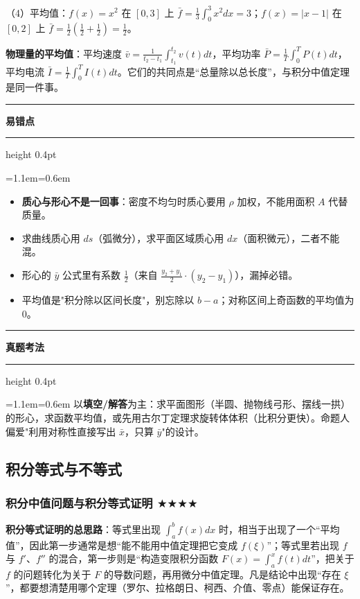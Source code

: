 \documentclass[11pt,openany,UTF8]{ctexbook}
\newcommand{\callouthead}[2]{%
  \par\addvspace{7pt}\noindent
  {\color{#1}\rule[-0.15em]{3pt}{1.05em}}\hspace{0.5em}%
  {\bfseries\color{#1}#2}\par\nobreak\vspace{-0.35em}%
  {\color{rulesep}\hrule height 0.4pt}\nobreak\vspace{0.45em}%
  \begingroup\small\setlength{\parindent}{0pt}%
  \leftskip=1.1em\rightskip=0.6em\noindent\ignorespaces}
\newcommand{\calloutend}{\par\endgroup\addvspace{7pt}}
\newenvironment{callwarn}[1]{\callouthead{warnbar}{#1}}{\calloutend}
\newenvironment{callexam}[1]{\callouthead{exambar}{#1}}{\calloutend}
\begin{document}
（4）平均值：$f(x)=x^2$ 在 $[0,3]$ 上 $\bar{f}=\frac{1}{3}\int_0^3x^2dx=3$；$f(x)=\lvert x-1\rvert$ 在 $[0,2]$ 上 $\bar{f}=\frac{1}{2}\left(\frac{1}{2}+\frac{1}{2}\right)=\frac{1}{2}$。

\textbf{物理量的平均值}：平均速度 $\bar{v}=\frac{1}{t_2-t_1}\int_{t_1}^{t_2}v(t)dt$，平均功率 $\bar{P}=\frac{1}{T}\int_0^TP(t)dt$，平均电流 $\bar{I}=\frac{1}{T}\int_0^TI(t)dt$。它们的共同点是“总量除以总长度”，与积分中值定理是同一件事。

\begin{callwarn}{易错点}
\begin{itemize}
\item \textbf{质心与形心不是一回事}：密度不均匀时质心要用 $\rho$ 加权，不能用面积 $A$ 代替质量。
\item 求曲线质心用 $ds$（弧微分），求平面区域质心用 $dx$（面积微元），二者不能混。
\item 形心的 $\bar{y}$ 公式里有系数 $\frac{1}{2}$（来自 $\frac{y_2+y_1}{2}\cdot(y_2-y_1)$），漏掉必错。
\item 平均值是"积分除以区间长度"，别忘除以 $b-a$；对称区间上奇函数的平均值为 $0$。
\end{itemize}
\end{callwarn}

\begin{callexam}{真题考法}
以\textbf{填空/解答}为主：求平面图形（半圆、抛物线弓形、摆线一拱）的形心，求函数平均值，或先用古尔丁定理求旋转体体积（比积分更快）。命题人偏爱"利用对称性直接写出 $\bar{x}$，只算 $\bar{y}$"的设计。

\end{callexam}

\subsection{积分等式与不等式}

\subsubsection{积分中值问题与积分等式证明 $\bigstar$$\bigstar$$\bigstar$$\bigstar$}

\textbf{积分等式证明的总思路}：等式里出现 $\int_a^bf(x)dx$ 时，相当于出现了一个“平均值”，因此第一步通常是想“能不能用中值定理把它变成 $f(\xi)$”；等式里若出现 $f$ 与 $f'$、$f''$ 的混合，第一步则是“构造变限积分函数 $F(x)=\int_a^xf(t)dt$”，把关于 $f$ 的问题转化为关于 $F$ 的导数问题，再用微分中值定理。凡是结论中出现“存在 $\xi$”，都要想清楚用哪个定理（罗尔、拉格朗日、柯西、介值、零点）能保证存在。
\end{document}
